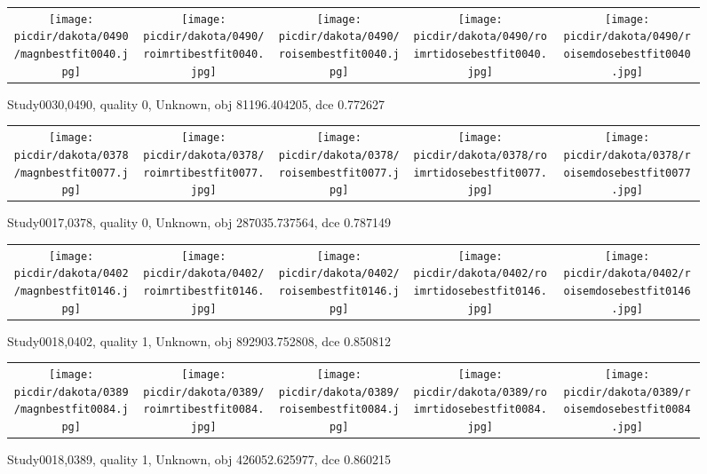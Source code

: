 \documentclass{article}
\newcommand{\picdir}{pdffig}
\begin{document}
\begin{figure} \begin{tabular}{ccccc} \scalebox{0.21}{\texttt{[image: \\picdir/dakota/0490/magnbestfit0040.jpg]}} & \scalebox{0.21}{\texttt{[image: \\picdir/dakota/0490/roimrtibestfit0040.jpg]}} & \scalebox{0.21}{\texttt{[image: \\picdir/dakota/0490/roisembestfit0040.jpg]}}  & \scalebox{0.21}{\texttt{[image: \\picdir/dakota/0490/roimrtidosebestfit0040.jpg]}} & \scalebox{0.21}{\texttt{[image: \\picdir/dakota/0490/roisemdosebestfit0040.jpg]}} \end{tabular} \caption{Study0030,0490, quality 0, Unknown, obj 81196.404205, dce 0.772627  } \label{Study00300490} \end{figure}
\begin{figure} \begin{tabular}{ccccc} \scalebox{0.21}{\texttt{[image: \\picdir/dakota/0378/magnbestfit0077.jpg]}} & \scalebox{0.21}{\texttt{[image: \\picdir/dakota/0378/roimrtibestfit0077.jpg]}} & \scalebox{0.21}{\texttt{[image: \\picdir/dakota/0378/roisembestfit0077.jpg]}}  & \scalebox{0.21}{\texttt{[image: \\picdir/dakota/0378/roimrtidosebestfit0077.jpg]}} & \scalebox{0.21}{\texttt{[image: \\picdir/dakota/0378/roisemdosebestfit0077.jpg]}} \end{tabular} \caption{Study0017,0378, quality 0, Unknown, obj 287035.737564, dce 0.787149  } \label{Study00170378} \end{figure}
\clearpage
\begin{figure} \begin{tabular}{ccccc} \scalebox{0.21}{\texttt{[image: \\picdir/dakota/0402/magnbestfit0146.jpg]}} & \scalebox{0.21}{\texttt{[image: \\picdir/dakota/0402/roimrtibestfit0146.jpg]}} & \scalebox{0.21}{\texttt{[image: \\picdir/dakota/0402/roisembestfit0146.jpg]}}  & \scalebox{0.21}{\texttt{[image: \\picdir/dakota/0402/roimrtidosebestfit0146.jpg]}} & \scalebox{0.21}{\texttt{[image: \\picdir/dakota/0402/roisemdosebestfit0146.jpg]}} \end{tabular} \caption{Study0018,0402, quality 1, Unknown, obj 892903.752808, dce 0.850812  } \label{Study00180402} \end{figure}
\begin{figure} \begin{tabular}{ccccc} \scalebox{0.21}{\texttt{[image: \\picdir/dakota/0389/magnbestfit0084.jpg]}} & \scalebox{0.21}{\texttt{[image: \\picdir/dakota/0389/roimrtibestfit0084.jpg]}} & \scalebox{0.21}{\texttt{[image: \\picdir/dakota/0389/roisembestfit0084.jpg]}}  & \scalebox{0.21}{\texttt{[image: \\picdir/dakota/0389/roimrtidosebestfit0084.jpg]}} & \scalebox{0.21}{\texttt{[image: \\picdir/dakota/0389/roisemdosebestfit0084.jpg]}} \end{tabular} \caption{Study0018,0389, quality 1, Unknown, obj 426052.625977, dce 0.860215  } \label{Study00180389} \end{figure}
\end{document}
